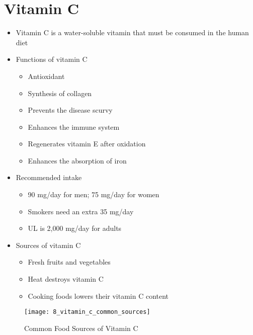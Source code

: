 \documentclass[title={Chapter 8}]{fdsn201notes}
\begin{document}
\section{Vitamin C}\label{sec:vitamin-c-8}
\begin{itemize}
	\item Vitamin C is a water-soluble vitamin that must be consumed in the human diet
	\item Functions of vitamin C
	\begin{itemize}
		\item Antioxidant
		\item Synthesis of collagen
		\item Prevents the disease scurvy
		\item Enhances the immune system
		\item Regenerates vitamin E after oxidation
		\item Enhances the absorption of iron
	\end{itemize}
	\item Recommended intake
	\begin{itemize}
		\item 90 mg/day for men; 75 mg/day for women
		\item Smokers need an extra 35 mg/day
		\item UL is 2,000 mg/day for adults
	\end{itemize}
	\item Sources of vitamin C
	\begin{itemize}
		\item Fresh fruits and vegetables
		\item Heat destroys vitamin C
		\item Cooking foods lowers their vitamin C content
	\end{itemize}
\end{itemize}

\begin{figure}[H]
	\centering
	\texttt{[image: 8\_vitamin\_c\_common\_sources]}
	\caption{Common Food Sources of Vitamin C}
	\label{fig:common-food-sources-of-vitamin-c}
\end{figure}
\end{document}
